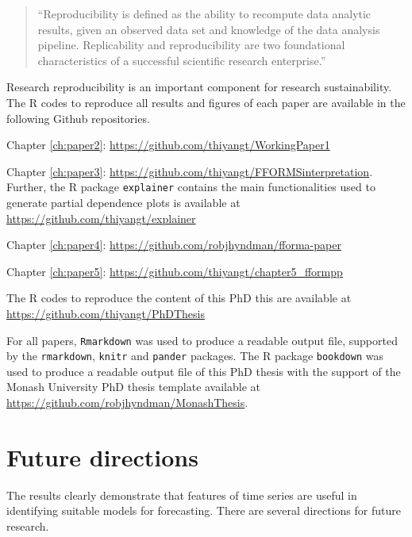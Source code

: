\documentclass{monashthesis}
\begin{document}
\begin{quote}
``Reproducibility is defined as the ability to recompute data analytic results, given an observed
data set and knowledge of the data analysis pipeline. Replicability and reproducibility are two
foundational characteristics of a successful scientific research enterprise.''
\end{quote}

Research reproducibility is an important component for research sustainability. The R codes to reproduce all results and figures of each paper are available in the following Github repositories.

Chapter \ref{ch:paper2}: \url{https://github.com/thiyangt/WorkingPaper1}

Chapter \ref{ch:paper3}: \url{https://github.com/thiyangt/FFORMSinterpretation}. Further, the R package \texttt{explainer} contains the main functionalities used to generate partial dependence plots is available at \url{https://github.com/thiyangt/explainer}

Chapter \ref{ch:paper4}: \url{https://github.com/robjhyndman/fforma-paper}

Chapter \ref{ch:paper5}: \url{https://github.com/thiyangt/chapter5_fformpp}

The R codes to reproduce the content of this PhD this are available at \url{https://github.com/thiyangt/PhDThesis}

For all papers, \texttt{Rmarkdown} was used to produce a readable output file, supported by the \texttt{rmarkdown}, \texttt{knitr} and \texttt{pander} packages. The R package \texttt{bookdown} was used to produce a readable output file of this PhD thesis with the support of the Monash University PhD thesis template available at \url{https://github.com/robjhyndman/MonashThesis}.

\hypertarget{future-directions}{%
\section{Future directions}\label{future-directions}}

The results clearly demonstrate that features of time series are useful in identifying suitable models for forecasting. There are several directions for future research.
\end{document}
